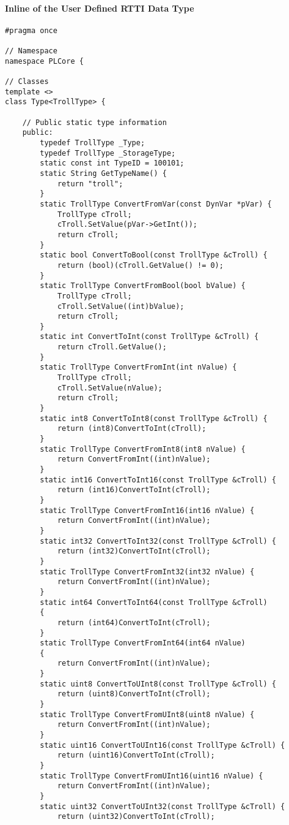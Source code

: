 \paragraph{Inline of the User Defined \ac{RTTI} Data Type}
\begin{lstlisting}[label=Code:UserDefinedRTTIDataTypeInline,caption={Inline of the user defined \ac{RTTI} data type}]
#pragma once

// Namespace
namespace PLCore {

// Classes
template <>
class Type<TrollType> {

	// Public static type information
	public:
		typedef TrollType _Type;
		typedef TrollType _StorageType;
		static const int TypeID = 100101;
		static String GetTypeName() {
			return "troll";
		}
		static TrollType ConvertFromVar(const DynVar *pVar) {
			TrollType cTroll;
			cTroll.SetValue(pVar->GetInt());
			return cTroll;
		}
		static bool ConvertToBool(const TrollType &cTroll) {
			return (bool)(cTroll.GetValue() != 0);
		}
		static TrollType ConvertFromBool(bool bValue) {
			TrollType cTroll;
			cTroll.SetValue((int)bValue);
			return cTroll;
		}
		static int ConvertToInt(const TrollType &cTroll) {
			return cTroll.GetValue();
		}
		static TrollType ConvertFromInt(int nValue) {
			TrollType cTroll;
			cTroll.SetValue(nValue);
			return cTroll;
		}
		static int8 ConvertToInt8(const TrollType &cTroll) {
			return (int8)ConvertToInt(cTroll);
		}
		static TrollType ConvertFromInt8(int8 nValue) {
			return ConvertFromInt((int)nValue);
		}
		static int16 ConvertToInt16(const TrollType &cTroll) {
			return (int16)ConvertToInt(cTroll);
		}
		static TrollType ConvertFromInt16(int16 nValue) {
			return ConvertFromInt((int)nValue);
		}
		static int32 ConvertToInt32(const TrollType &cTroll) {
			return (int32)ConvertToInt(cTroll);
		}
		static TrollType ConvertFromInt32(int32 nValue) {
			return ConvertFromInt((int)nValue);
		}
		static int64 ConvertToInt64(const TrollType &cTroll)
		{
			return (int64)ConvertToInt(cTroll);
		}
		static TrollType ConvertFromInt64(int64 nValue)
		{
			return ConvertFromInt((int)nValue);
		}
		static uint8 ConvertToUInt8(const TrollType &cTroll) {
			return (uint8)ConvertToInt(cTroll);
		}
		static TrollType ConvertFromUInt8(uint8 nValue) {
			return ConvertFromInt((int)nValue);
		}
		static uint16 ConvertToUInt16(const TrollType &cTroll) {
			return (uint16)ConvertToInt(cTroll);
		}
		static TrollType ConvertFromUInt16(uint16 nValue) {
			return ConvertFromInt((int)nValue);
		}
		static uint32 ConvertToUInt32(const TrollType &cTroll) {
			return (uint32)ConvertToInt(cTroll);

\end{lstlisting}
